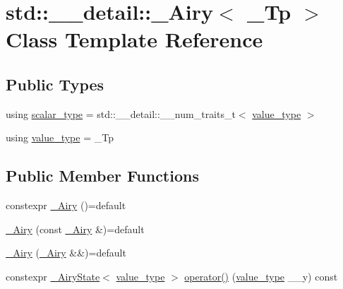 \hypertarget{classstd_1_1____detail_1_1__Airy}{}\section{std\+:\+:\+\_\+\+\_\+detail\+:\+:\+\_\+\+Airy$<$ \+\_\+\+Tp $>$ Class Template Reference}
\label{classstd_1_1____detail_1_1__Airy}
\subsection*{Public Types}
\begin{DoxyCompactItemize}
\item 
using \hyperlink{classstd_1_1____detail_1_1__Airy_a266cdfcc86b36c8743fd0e102387e1f0}{scalar\+\_\+type} = std\+::\+\_\+\+\_\+detail\+::\+\_\+\+\_\+num\+\_\+traits\+\_\+t$<$ \hyperlink{classstd_1_1____detail_1_1__Airy_a99e7e546930fbd7a846f6933a9b4b437}{value\+\_\+type} $>$
\item 
using \hyperlink{classstd_1_1____detail_1_1__Airy_a99e7e546930fbd7a846f6933a9b4b437}{value\+\_\+type} = \+\_\+\+Tp
\end{DoxyCompactItemize}
\subsection*{Public Member Functions}
\begin{DoxyCompactItemize}
\item 
constexpr \hyperlink{classstd_1_1____detail_1_1__Airy_a7f9ac77b331e5fdf275923c66d833954}{\+\_\+\+Airy} ()=default
\item 
\hyperlink{classstd_1_1____detail_1_1__Airy_a5e85ee9455eebffcd4e53c0acab47475}{\+\_\+\+Airy} (const \hyperlink{classstd_1_1____detail_1_1__Airy}{\+\_\+\+Airy} \&)=default
\item 
\hyperlink{classstd_1_1____detail_1_1__Airy_a6817af23cf74252d00f3a300f2c0b0eb}{\+\_\+\+Airy} (\hyperlink{classstd_1_1____detail_1_1__Airy}{\+\_\+\+Airy} \&\&)=default
\item 
constexpr \hyperlink{structstd_1_1____detail_1_1__AiryState}{\+\_\+\+Airy\+State}$<$ \hyperlink{classstd_1_1____detail_1_1__Airy_a99e7e546930fbd7a846f6933a9b4b437}{value\+\_\+type} $>$ \hyperlink{classstd_1_1____detail_1_1__Airy_aae4af53f88751d35b028055a2f8c5e2b}{operator()} (\hyperlink{classstd_1_1____detail_1_1__Airy_a99e7e546930fbd7a846f6933a9b4b437}{value\+\_\+type} \+\_\+\+\_\+y) const
\end{DoxyCompactItemize}
